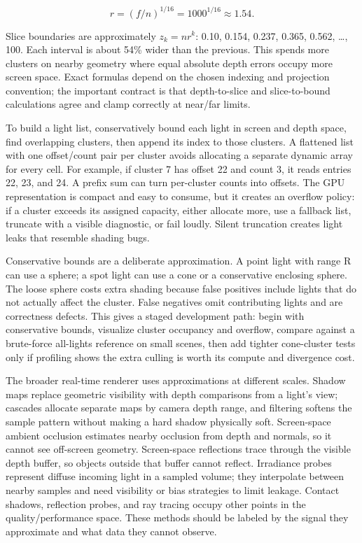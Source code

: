 \[
r=(f/n)^{1/16}=1000^{1/16}\approx1.54.
\]

Slice boundaries are approximately \(z_k=n r^k\): 0.10, 0.154, 0.237, 0.365, 0.562, \ldots, 100. Each interval is about 54\% wider than the previous. This spends more clusters on nearby geometry where equal absolute depth errors occupy more screen space. Exact formulas depend on the chosen indexing and projection convention; the important contract is that depth-to-slice and slice-to-bound calculations agree and clamp correctly at near/far limits.

To build a light list, conservatively bound each light in screen and depth space, find overlapping clusters, then append its index to those clusters. A flattened list with one offset/count pair per cluster avoids allocating a separate dynamic array for every cell. For example, if cluster 7 has offset 22 and count 3, it reads entries 22, 23, and 24. A prefix sum can turn per-cluster counts into offsets. The GPU representation is compact and easy to consume, but it creates an overflow policy: if a cluster exceeds its assigned capacity, either allocate more, use a fallback list, truncate with a visible diagnostic, or fail loudly. Silent truncation creates light leaks that resemble shading bugs.

Conservative bounds are a deliberate approximation. A point light with range R can use a sphere; a spot light can use a cone or a conservative enclosing sphere. The loose sphere costs extra shading because false positives include lights that do not actually affect the cluster. False negatives omit contributing lights and are correctness defects. This gives a staged development path: begin with conservative bounds, visualize cluster occupancy and overflow, compare against a brute-force all-lights reference on small scenes, then add tighter cone-cluster tests only if profiling shows the extra culling is worth its compute and divergence cost.

The broader real-time renderer uses approximations at different scales. Shadow maps replace geometric visibility with depth comparisons from a light's view; cascades allocate separate maps by camera depth range, and filtering softens the sample pattern without making a hard shadow physically soft. Screen-space ambient occlusion estimates nearby occlusion from depth and normals, so it cannot see off-screen geometry. Screen-space reflections trace through the visible depth buffer, so objects outside that buffer cannot reflect. Irradiance probes represent diffuse incoming light in a sampled volume; they interpolate between nearby samples and need visibility or bias strategies to limit leakage. Contact shadows, reflection probes, and ray tracing occupy other points in the quality/performance space. These methods should be labeled by the signal they approximate and what data they cannot observe.

